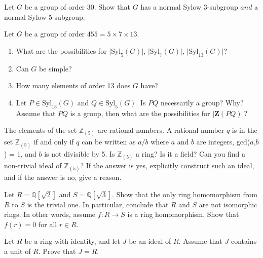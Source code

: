 \documentclass[12pt,letterpaper,boxed]{hmcpset}
\begin{document}

\begin{problem}[12.3.13]
Let $G$ be a group of order 30. Show that $G$ has a normal Sylow 3-subgroup $\textit{and}$ a normal Sylow 5-subgroup. 
\end{problem}

\begin{solution}
\end{solution}

\clearpage

\begin{problem}[12.3.16]
Let $G$ be a group of order $455 = 5 \times 7 \times 13$.
\begin{enumerate}[label=\alph*]
\item What are the possibilities for $\vert \text{Syl}_5(G) \vert$, $\vert \text{Syl}_7(G) \vert$, $\vert \text{Syl}_{13}(G) \vert$?
\item Can $G$ be simple?
\item How many elements of order 13 does $G$ have?
\item Let $P \in \text{Syl}_{13}(G)$ and $Q \in \text{Syl}_5(G)$. Is $PQ$ necessarily a group? Why? Assume that $PQ$ is a group, then what are the possibilities for $\vert \textbf{Z}(PQ) \vert$?
\end{enumerate}
\end{problem}

\begin{solution}
\end{solution}

\clearpage

\begin{problem}[16.1.9]
The elements of the set $\mathbb{Z}_{(5)}$ are rational numbers. A rational number $q$ is in the set $\mathbb{Z}_{(5)}$ if and only if $q$ can be written as $a/b$ where $a$ and $b$ are integers, gcd($a$,$b$) = 1, and $b$ is not divisible by 5. Is $\mathbb{Z}_{(5)}$ a ring? Is it a field? Can you find a non-trivial ideal of $\mathbb{Z}_{(5)}$? If the answer is yes, explicitly construct such an ideal, and if the answer is no, give a reason.
\end{problem}

\begin{solution}
\end{solution}

\clearpage

\begin{problem}[16.1.10]
Let $R = \mathbb{Q}[\sqrt{2}]$ and $S = \mathbb{Q}[\sqrt{3}]$. Show that the only ring homomorphism from $R$ to $S$ is the trivial one. In particular, conclude that $R$ and $S$ are not isomorphic rings. In other words, assume $f : R \rightarrow S$ is a ring homomorphism. Show that $f(r) = 0$ for all $r \in R$.
\end{problem}

\begin{solution}
\end{solution}

\clearpage

\begin{problem}[16.1.20]
Let $R$ be a ring with identity, and let $J$ be an ideal of $R$. Assume that $J$ contains a unit of $R$. Prove that $J = R$.
\end{problem}

\begin{solution}

\end{solution}
\end{document}
